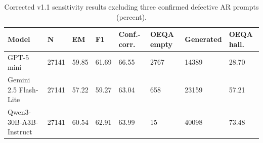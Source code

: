 \begin{table}[t]
\centering
\small
\begin{tabular}{llllllll}
\toprule
Model & N & EM & F1 & Conf.-corr. & OEQA empty & Generated & OEQA hall. \\
\midrule
GPT-5 mini & 27141 & 59.85 & 61.69 & 66.55 & 2767 & 14389 & 28.70 \\
Gemini 2.5 Flash-Lite & 27141 & 57.22 & 59.27 & 63.04 & 658 & 23159 & 57.21 \\
Qwen3-30B-A3B-Instruct & 27141 & 60.54 & 62.91 & 63.99 & 15 & 40098 & 73.48 \\
\bottomrule
\end{tabular}
\caption{Corrected v1.1 sensitivity results excluding three confirmed defective AR prompts (percent).}
\label{tab:core-v11-overall-ar-sensitivity}
\end{table}
